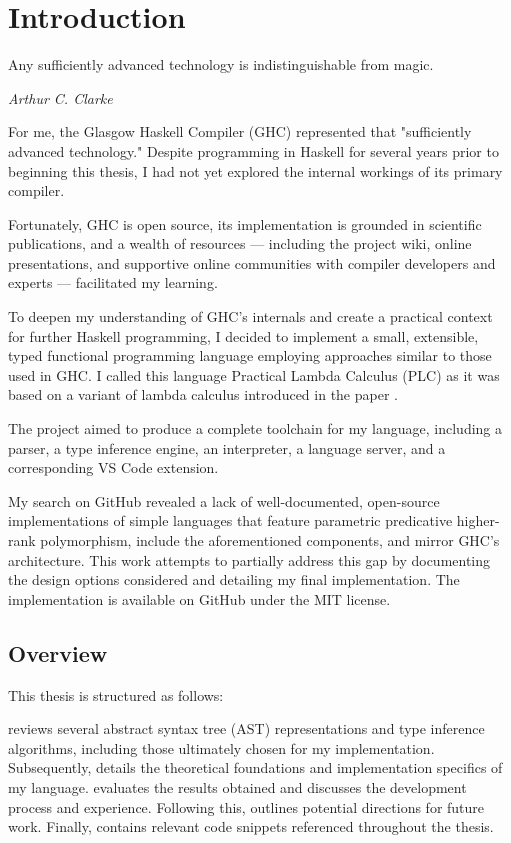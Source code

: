 \chapter{Introduction}
\label{chap:Introduction}

\epigraph{Any sufficiently advanced technology is indistinguishable from magic.}{\textit{Arthur C. Clarke}}

For me, the Glasgow Haskell Compiler (GHC) \cite{ghc-site-2025} represented that "sufficiently advanced technology."
Despite programming in Haskell for several years prior to beginning this thesis, I had not yet explored the internal workings of its primary compiler.

Fortunately, GHC is open source, its implementation is grounded in scientific publications, and a wealth of resources --- including the project wiki, online presentations, and supportive online communities with compiler developers and experts --- facilitated my learning.

To deepen my understanding of GHC's internals and create a practical context for further Haskell programming, I decided to implement a small, extensible, typed functional programming language employing approaches similar to those used in GHC. I called this language Practical Lambda Calculus (PLC) as it was based on a variant of lambda calculus introduced in the paper  \cite{jones-practical-2007}.

The project aimed to produce a complete toolchain for my language, including a parser, a type inference engine, an interpreter, a language server, and a corresponding VS Code extension.

My search on GitHub revealed a lack of well-documented, open-source implementations of simple languages that feature parametric predicative higher-rank polymorphism, include the aforementioned components, and mirror GHC's architecture. This work attempts to partially address this gap by documenting the design options considered and detailing my final implementation. The implementation \cite{deemp-higher-rank-free-foil} is available on GitHub under the MIT license.

\section{Overview}

This thesis is structured as follows:

 reviews several abstract syntax tree (AST) representations and type inference algorithms, including those ultimately chosen for my implementation.
Subsequently,  details the theoretical foundations and implementation specifics of my language.
 evaluates the results obtained and discusses the development process and experience.
Following this,  outlines potential directions for future work.
Finally,  contains relevant code snippets referenced throughout the thesis.